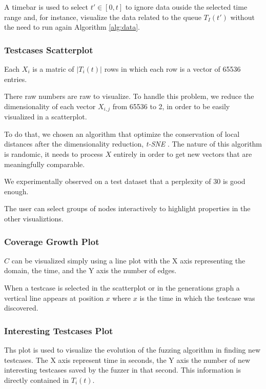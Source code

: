 \documentclass[conference,compsoc]{IEEEtran}
\begin{document}
A timebar is used to select $t' \in [0, t]$ to ignore data ouside the selected time range and, for instance, visualize the data related to the queue $T_I(t')$ without the need to run again Algorithm \ref{alg:data}.

\subsubsection{Testcases Scatterplot}

Each $X_i$ is a matric of $|T_i(t)|$ rows in which each row is a vector of 65536 entries.

There raw numbers are raw to visualize. To handle this problem, we reduce the dimensionality of each vector $X_{i,j}$ from 65536 to 2, in order to be easily visualized in a scatterplot.

To do that, we chosen an algorithm that optimize the conservation of local distances after the dimensionality reduction, {\em t-SNE} \cite{maaten2008visualizing}. The nature of this algorithm is randomic, it needs to process $X$ entirely in order to get new vectors that are meaningfully comparable.

We experimentally observed on a test dataset that a perplexity of 30 is good enough.

The user can select groups of nodes interactively to highlight properties in the other visualiztions.

\subsubsection{Coverage Growth Plot}

$C$ can be visualized simply using a line plot with the X axis representing the domain, the time, and the Y axis the number of edges.

When a testcase is selected in the scatterplot or in the generations graph a vertical line appears at position $x$ where $x$ is the time in which the testcase was discovered.

\subsubsection{Interesting Testcases Plot}

Ths plot is used to visualize the evolution of the fuzzing algorithm in finding new testcases. The X axis represent time in seconds, the Y axis the number of new interesting testcases saved by the fuzzer in that second.
This information is directly contained in $T_i(t)$.
\end{document}
